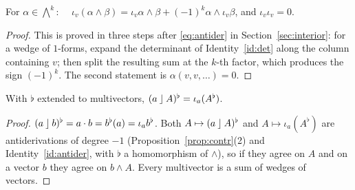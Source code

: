 \begin{identity}\label{id:antider}
For $\alpha\in\bigwedge^k$: $\quad\iota_v(\alpha\wedge\beta)=\iota_v\alpha\wedge\beta+(-1)^k\alpha\wedge\iota_v\beta$, and $\iota_v\iota_v=0$.
\end{identity}
\begin{proof}
This is proved in three steps after \eqref{eq:antider} in Section~\ref{sec:interior}: for a wedge of $1$-forms, expand the
determinant of Identity~\ref{id:det} along the column containing $v$; then split the resulting sum at the $k$-th factor, which
produces the sign $(-1)^k$. The second statement is $\alpha(v,v,\dots)=0$.
\end{proof}

\begin{identity}\label{id:lcisiota}
With $\flat$ extended to multivectors, $(a\mathbin{\rfloor} A)^\flat=\iota_a(A^\flat)$.
\end{identity}
\begin{proof}
 $(a\mathbin{\rfloor} b)^\flat=a\cdot b=b^\flat(a)=\iota_ab^\flat$.
 Both $A\mapsto(a\mathbin{\rfloor} A)^\flat$ and $A\mapsto\iota_a(A^\flat)$ are antiderivations of degree $-1$
(Proposition~\ref{prop:contr}(2) and Identity~\ref{id:antider}, with $\flat$ a homomorphism of $\wedge$), so if they agree on $A$
and on a vector $b$ they agree on $b\wedge A$. Every multivector is a sum of wedges of vectors.
\end{proof}

